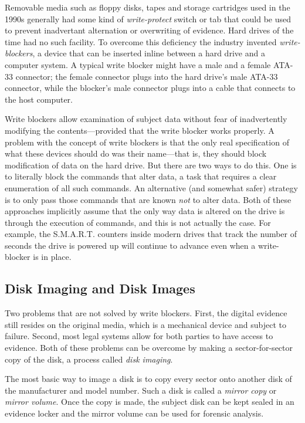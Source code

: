 Removable media such as floppy disks, tapes and storage cartridges
used in the 1990s generally had some kind of \emph{write-protect}
switch or tab that could be used to prevent inadvertant alternation or
overwriting of evidence. Hard drives of the time had no such
facility. To overcome this deficiency the industry invented
\emph{write-blockers}, a device that can be inserted inline between a
hard drive and a computer system. A typical write blocker might have a
male and a female ATA-33 connector; the female connector plugs into
the hard drive's male ATA-33 connector, while the blocker's male
connector plugs into a cable that connects to the host computer.

Write blockers allow examination of subject data without fear of
inadvertently modifying the contents---provided that the write blocker
works properly. A problem with the concept of write blockers is that
the only real specification of what these devices should do was their
name---that is, they should block modification of data on the hard
drive.  But there
are two ways to do this. One is to literally block the commands that
alter data, a task that requires a clear enumeration of all such
commands. An alternative (and somewhat safer) strategy is to only pass
those commands that are known \emph{not} to alter
data\cite{dfrws2006:JamesLyle}. Both of these approaches
implicitly assume that the only way data is altered on the drive is
through the execution of commands, and this is not actually the
case. For example, the S.M.A.R.T. counters inside modern drives that
track the number of seconds the drive is powered up will continue to
advance even when a write-blocker is in place.

\subsection{Disk Imaging and Disk Images}
Two problems that are not solved by write blockers. First, the
digital evidence still resides on the original media, which is a
mechanical device and subject to failure. Second, most legal systems
allow for both parties to have access to evidence. Both of these
problems can be overcome by making a sector-for-sector copy of the
disk, a process called \emph{disk imaging}.

The most basic way to image a disk is to copy every sector onto
another disk of the manufacturer and model number. Such a disk is
called a \emph{mirror copy} or \emph{mirror volume}. Once the copy is made, the subject disk
can be kept sealed in an evidence locker and the mirror volume can be
used for forensic analysis. 

